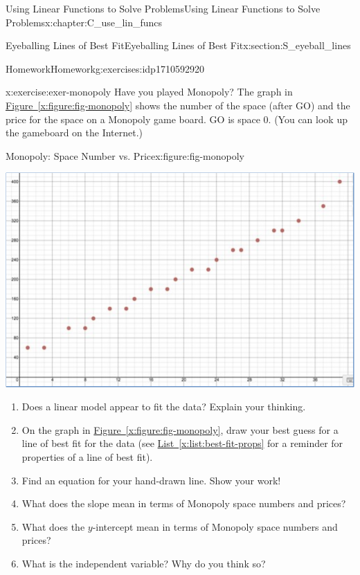 \documentclass[oneside,10pt,]{book}
\newcommand{\xreffont}{\relax}
\numberwithin{equation}{chapter}
\begin{document}
\begin{chapterptx}{Using Linear Functions to Solve Problems}{}{Using Linear Functions to Solve Problems}{}{}{x:chapter:C_use_lin_funcs}
\begin{sectionptx}{Eyeballing Lines of Best Fit}{}{Eyeballing Lines of Best Fit}{}{}{x:section:S_eyeball_lines}
\begin{exercises-subsection}{Homework}{}{Homework}{}{}{g:exercises:idp1710592920}
%
\begin{divisionexercise}{2}{}{}{x:exercise:exer-monopoly}%
Have you played Monopoly? The graph in \hyperref[x:figure:fig-monopoly]{Figure~{\xreffont\ref{x:figure:fig-monopoly}}} shows the number of the space (after GO) and the price for the space on a Monopoly game board. GO is space 0. (You can look up the gameboard on the Internet.)%
\begin{figureptx}{Monopoly: Space Number vs. Price}{x:figure:fig-monopoly}{}%
\begin{image}{0.125}{0.75}{0.125}%
\includegraphics[width=\linewidth]{external/monopoly.pdf}
\end{image}%
\tcblower
\end{figureptx}%
\begin{enumerate}[font=\bfseries,label=(\alph*),ref=\alph*]
\item{}Does a linear model appear to fit the data? Explain your thinking.%
\item{}On the graph in \hyperref[x:figure:fig-monopoly]{Figure~{\xreffont\ref{x:figure:fig-monopoly}}}, draw your best guess for a line of best fit for the data (see \hyperref[x:list:best-fit-props]{List~{\xreffont\ref{x:list:best-fit-props}}} for a reminder for properties of a line of best fit).%
\item{}Find an equation for your hand-drawn line. Show your work!%
\item{}What does the slope mean in terms of Monopoly space numbers and prices?%
\item{}What does the \(y\)-intercept mean in terms of Monopoly space numbers and prices?%
\item{}What is the independent variable? Why do you think so?%

\end{enumerate}
\end{divisionexercise}
\end{exercises-subsection}
\end{sectionptx}
\end{chapterptx}
\end{document}
